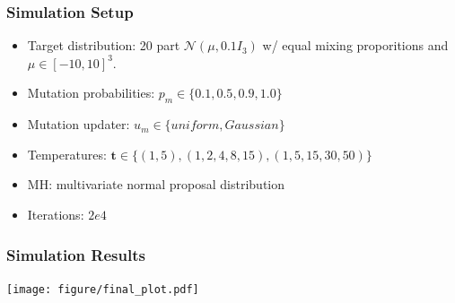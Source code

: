 \documentclass{beamer}\usepackage[]{graphicx}\usepackage[]{color}
\newcommand{\bt}{\mathbf t}
\begin{document}
\begin{frame}
  \frametitle{Simulation Setup}
  \begin{itemize}
  \item Target distribution: 20 part $\mathcal{N}(\mu, 0.1I_3)$ w/ equal mixing proporitions and $\mu \in [-10, 10]^3$.
  \item Mutation probabilities: $p_m \in \{0.1, 0.5, 0.9, 1.0\}$
  \item Mutation updater: $u_m \in \{uniform, Gaussian\}$
  \item Temperatures: $ \bt \in \{ (1,5), (1, 2, 4, 8, 15), (1,5,15,30,50) \}$
  \item MH: multivariate normal proposal distribution
  \item Iterations: $2e4$
  \end{itemize}
\end{frame}

\begin{frame}
  \frametitle{Simulation Results}
  \vspace{-.6in}
  \centering
  \texttt{[image: figure/final\_plot.pdf]}
\end{frame}
\end{document}
